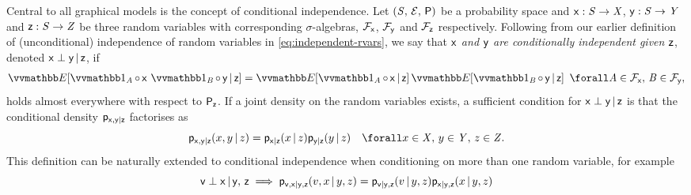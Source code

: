 Central to all graphical models is the concept of conditional independence. Let $(\mathit{S},\,\mathcal{E},\,\mathsf{P})$ be a probability space and $\mathsf{x} : \mathit{S} \to \mathit{X}$, $\mathsf{y} : \mathit{S} \to \mathit{Y}$ and $\mathsf{z} : \mathit{S} \to \mathit{Z}$ be three random variables with corresponding $\sigma$-algebras, $\mathcal{F}_{\mathsf{x}}$, $\mathcal{F}_{\mathsf{y}}$ and $\mathcal{F}_{\mathsf{z}}$ respectively. Following from our earlier definition of (unconditional) independence of random variables in \eqref{eq:independent-rvars}, we say that \emph{$\mathsf{x}$ and $\mathsf{y}$ are conditionally independent given $\mathsf{z}$}, denoted $\mathsf{x} \perp \mathsf{y} \operatorname{|} \mathsf{z}$, if
\begin{equation}\label{eq:conditional-independence-property}
\begin{split}
  \expc{\ind{\set{A}}\circ\,\rvar{x} \, \ind{\set{B}}\circ\,\rvar{y} \gvn\rvar{z}} =
  \expc{\ind{\set{A}}\circ\,\rvar{x}\gvn\rvar{z}}\,
  \expc{\ind{\set{B}}\circ\,\rvar{y}\gvn\rvar{z}}
  ~\,\forall 
  \set{A} \in \sset{F}_{\rvar{x}},\,
  \set{B} \in \sset{F}_{\rvar{y}},
\end{split}	
\end{equation}
holds almost everywhere with respect to $\mathsf{P}_{\mathsf{z}}$. 
If a joint density on the random variables exists, a sufficient condition for $\mathsf{x} \perp \mathsf{y} \operatorname{|} \mathsf{z}$ is that the conditional density $\mathsf{p}_{\mathsf{x},\mathsf{y}|\mathsf{z}}$ factorises as
\begin{equation}\label{eq:conditional-independence-densities}
  \pden{\rvar{x},\rvar{y}|\rvar{z}}(x,y \gvn z) =
  \pden{\rvar{x}|\rvar{z}}(x \gvn z)
  \pden{\rvar{y}|\rvar{z}}(y \gvn z)
  \quad \forall 
  x \in \set{X},\,
  y \in \set{Y},\,
  z \in \set{Z}.
\end{equation}
This definition can be naturally extended to conditional independence when conditioning on more than one random variable, for example
\begin{equation}\label{eq:conditional-independence-many-vars}
  \mathsf{v} \perp \mathsf{x} \operatorname{|} \mathsf{y},\,\mathsf{z} \implies
  \mathsf{p}_{\mathsf{v},\mathsf{x}|\mathsf{y},\mathsf{z}}(v,x \operatorname{|} y,z) =
  \mathsf{p}_{\mathsf{v}|\mathsf{y},\mathsf{z}}(v \operatorname{|} y,z)
  \mathsf{p}_{\mathsf{x}|\mathsf{y},\mathsf{z}}(x \operatorname{|} y,z)
\end{equation}

